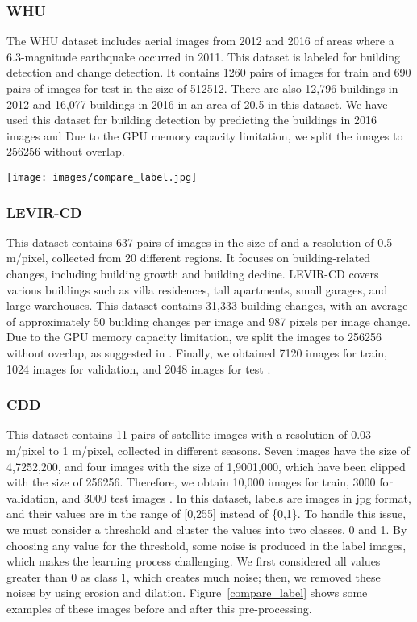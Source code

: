 \documentclass{article}
\begin{document}
\subsubsection{WHU}
The WHU dataset includes aerial images from 2012 and 2016 of areas where a 6.3-magnitude earthquake occurred in 2011. This dataset is labeled for building detection and change detection. It contains 1260 pairs of images for train and 690 pairs of images for test in the size of 512512. There are also 12,796 buildings in 2012 and 16,077 buildings in 2016 in an area of 20.5  in this dataset. We have used this dataset for building detection by predicting the buildings in 2016 images \cite{ji2018fully} and Due to the GPU memory capacity limitation, we split the images to 256256 without overlap.


\begin{figure*}[t!]
	\begin{center}
		\texttt{[image: images/compare\_label.jpg]}
		\caption{Labels of the CDD dataset, before and after pre-processing.}
		\label{compare_label}
	\end{center}
\end{figure*}

\subsubsection{LEVIR-CD}
This dataset contains 637 pairs of images in the size of  and a resolution of 0.5 m/pixel, collected from 20 different regions. It focuses on building-related changes, including building growth and building decline. LEVIR-CD covers various buildings such as villa residences, tall apartments, small garages, and large warehouses. This dataset contains 31,333 building changes, with an average of approximately 50 building changes per image and 987 pixels per image change. Due to the GPU memory capacity limitation, we split the images to 256256 without overlap, as suggested in \cite{chen2021remote}. Finally, we obtained 7120 images for train, 1024 images for validation, and 2048 images for test \cite{chen2020spatial}.

\subsubsection{CDD}
This dataset contains 11 pairs of satellite images with a resolution of 0.03 m/pixel to 1 m/pixel, collected in different seasons. Seven images have the size of 4,7252,200, and four images with the size of 1,9001,000, which have been clipped with the size of 256256. Therefore, we obtain 10,000 images for train, 3000 for validation, and 3000 test images \cite{lebedev2018change}. In this dataset, labels are images in jpg format, and their values are in the range of [0,255] instead of \{0,1\}. To handle this issue, we must consider a threshold and cluster the values into two classes, 0 and 1. By choosing any value for the threshold, some noise is produced in the label images, which makes the learning process challenging. We first considered all values greater than 0 as class 1, which creates much noise; then, we removed these noises by using erosion and dilation. Figure~\ref{compare_label} shows some examples of these images before and after this pre-processing.
\end{document}
